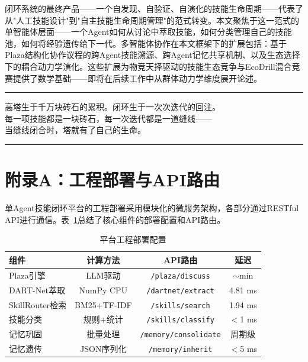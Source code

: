\documentclass[12pt,a4paper]{ctexart}
\begin{document}
闭环系统的最终产品——一个自发现、自验证、自演化的技能生命周期——代表了从"人工技能设计"到"自主技能生命周期管理"的范式转变。本文聚焦于这一范式的单智能体层面——一个Agent如何从讨论中萃取技能，如何分类管理自己的技能池，如何将经验遗传给下一代。多智能体协作在本文框架下的扩展包括：基于Plaza结构化协作议程的跨Agent技能溯源、跨Agent记忆共享机制、以及生态选择下的耦合动力学演化。这些扩展为物竞天择驱动的技能生态竞争与EcoDrill混合竞赛提供了数学基础——即将在后续工作中从群体动力学维度展开论述。

\vspace{12pt}
\hrule
\vspace{8pt}

\begin{center}
{\kaishu 高塔生于千万块砖石的累积。闭环生于一次次迭代的回注。\\
每一项技能都是一块砖石，每一次迭代都是一道缝线——\\
当缝线闭合时，塔就有了自己的生命。}
\end{center}

\vspace{8pt}
\hrule
\vspace{12pt}

\section*{附录A：工程部署与API路由}

单Agent技能闭环平台的工程部署采用模块化的微服务架构，各部分通过RESTful API进行通信。表~\ref{tab:deployment}总结了核心组件的部署配置和API路由。

\begin{table}[H]
\centering
\caption{平台工程部署配置}
\label{tab:deployment}
\renewcommand{\arraystretch}{1.2}
\begin{tabular}{lccc}
\toprule
组件 & 计算方法 & API路由 & 延迟 \\
\midrule
Plaza引擎 & LLM驱动 & \texttt{/plaza/discuss} & $\sim$min \\
DART-Net萃取 & NumPy CPU & \texttt{/dartnet/extract} & 4.81 ms \\
SkillRouter检索 & BM25+TF-IDF & \texttt{/skills/search} & 1.94 ms \\
技能分类 & 规则+统计 & \texttt{/skills/classify} & $<$1 ms \\
记忆巩固 & 批量处理 & \texttt{/memory/consolidate} & 周期级 \\
记忆遗传 & JSON序列化 & \texttt{/memory/inherit} & $<$5 ms \\
\bottomrule
\end{tabular}
\end{table}
\end{document}
